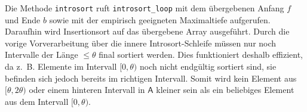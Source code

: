 Die Methode \texttt{introsort} ruft \texttt{introsort\_loop} mit dem übergebenen Anfang $f$ und Ende $b$ sowie
mit der empirisch geeigneten Maximaltiefe aufgerufen. Daraufhin wird Insertionsort auf das übergebene Array ausgeführt.
Durch die vorige Vorverarbeitung über die innere Introsort-Schleife müssen nur noch Intervalle
der Länge $\leq \theta$ final sortiert werden.
Dies funktioniert deshalb effizient, da z.~B. Elemente im Intervall $[0, \theta)$ noch nicht
endgültig sortiert sind, sie befinden sich jedoch bereits im richtigen Intervall.
Somit wird kein Element aus $[\theta, 2 \theta)$ oder einem hinteren Intervall in $\mathsf A$ kleiner
sein als ein beliebiges Element aus dem Intervall $[0,\theta)$.
